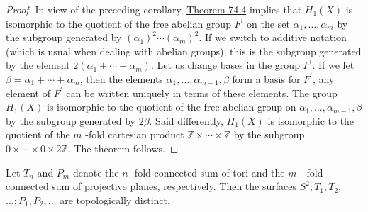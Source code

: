 \begin{proof}
	In view of the preceding corollary, \hyperref[thm:74.4]{Theorem 74.4} implies that \(H_{1}( X)\) is isomorphic to the quotient of the free abelian group \(F^{\prime }\) on the set \({\alpha }_{1},\ldots ,{\alpha }_{m}\) by the subgroup generated by \({( {\alpha }_{1}) }^{2}\cdots {( {\alpha }_{m}) }^{2}\). If we switch to additive notation (which is usual when dealing with abelian groups), this is the subgroup generated by the element \(2( {{\alpha }_{1} + \cdots + {\alpha }_{m}})\). Let us change bases in the group \(F^{\prime }\). If we let \(\beta = {\alpha }_{1} + \cdots + {\alpha }_{m}\), then the elements \({\alpha }_{1},\ldots ,{\alpha }_{m - 1},\beta\) form a basis for \(F^{\prime }\), any element of \(F^{\prime }\) can be written uniquely in terms of these elements. The group \(H_{1}( X)\) is isomorphic to the quotient of the free abelian group on \({\alpha }_{1},\ldots ,{\alpha }_{m - 1},\beta\) by the subgroup generated by \({2\beta }\). Said differently, \(H_{1}( X)\) is isomorphic to the quotient of the \(m\) -fold cartesian product \(\mathbb{Z} \times \cdots \times \mathbb{Z}\) by the subgroup \(0 \times \cdots \times 0 \times 2\mathbb{Z}\). The theorem follows.
\end{proof}
\begin{theorem}
\label{thm:\thetheorem}
	Let \(T_{n}\) and \(P_{m}\) denote the \(n\) -fold connected sum of tori and the \(m\) - fold connected sum of projective planes, respectively. Then the surfaces \(S^{2};T_{1},T_{2}\), \(\ldots ;P_{1},P_{2},\ldots\) are topologically distinct.
\end{theorem}

